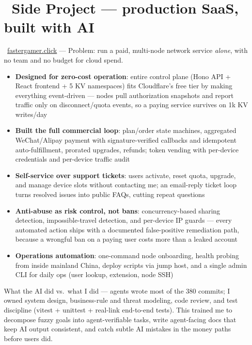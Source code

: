 \documentclass{resume}
\begin{document}
\section{\faLightbulbO\ Side Project --- production SaaS, built with AI}
\begin{onehalfspacing}
\faGlobe\ \href{https://fastergamer.click}{fastergamer.click} ---
Problem: run a paid, multi-node network service \emph{alone}, with no team and no budget for cloud spend.
\begin{itemize}
	\item \textbf{Designed for zero-cost operation}: entire control plane (Hono API + React frontend + 5 KV namespaces) fits Cloudflare's free tier by making everything event-driven --- nodes pull authorization snapshots and report traffic only on disconnect/quota events, so a paying service survives on 1k KV writes/day
	\item \textbf{Built the full commercial loop}: plan/order state machines, aggregated WeChat/Alipay payment with signature-verified callbacks and idempotent auto-fulfillment, prorated upgrades, refunds; token vending with per-device credentials and per-device traffic audit
	\item \textbf{Self-service over support tickets}: users activate, reset quota, upgrade, and manage device slots without contacting me; an email-reply ticket loop turns resolved issues into public FAQs, cutting repeat questions
	\item \textbf{Anti-abuse as risk control, not bans}: concurrency-based sharing detection, impossible-travel detection, and per-device IP guards --- every automated action ships with a documented false-positive remediation path, because a wrongful ban on a paying user costs more than a leaked account
	\item \textbf{Operations automation}: one-command node onboarding, health probing from inside mainland China, deploy scripts via jump host, and a single admin CLI for daily ops (user lookup, extension, node SSH)
\end{itemize}
What the AI did vs.\ what I did --- agents wrote most of the 380 commits; I owned system design, business-rule and threat modeling, code review, and test discipline (vitest + unittest + real-link end-to-end tests).
This trained me to decompose fuzzy goals into agent-verifiable tasks, write agent-facing docs that keep AI output consistent, and catch subtle AI mistakes in the money paths before users did.
\end{onehalfspacing}
\end{document}
